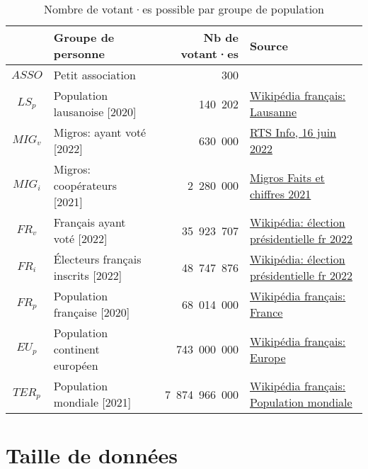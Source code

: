 \documentclass[../report]{subfiles}
\begin{document}
\begin{table}[H]
  \begin{center}
    \begin{tabular}{|c|l|r|l|}
      \hline
       & Groupe de personne                          & Nb de votant·es & Source \\
      \hline
      \hline
      $ASSO$ & Petit association                  & 300 & \\
      $LS_p$ & Population lausanoise [2020]       &         140~202 & \href{https://fr.wikipedia.org/wiki/Lausanne}{Wikipédia français: Lausanne}\\
      $MIG_v$ & Migros: ayant voté [2022]         &         630~000 & \href{https://www.rts.ch/info/suisse/13176954-la-vente-dalcool-reste-interdite-a-la-migros-apres-un-non-massif-en-votation.html}{RTS Info, 16 juin 2022}\\
      $MIG_i$ & Migros: coopérateurs [2021]       &       2~280~000 & \href{https://corporate.migros.ch/dam/jcr:d5b1ae79-a8e8-4b98-9f2d-4b4974d39486/faits-et-chiffres-2021.pdf}{Migros Faits et chiffres 2021}\\
      $FR_v$ & Français ayant voté [2022]         &      35~923~707 & \href{https://fr.wikipedia.org/wiki/Élection_présidentielle_française_de_2022}{Wikipédia: élection présidentielle fr 2022}\\
      $FR_i$ & Électeurs français inscrits [2022] &      48~747~876 & \href{https://fr.wikipedia.org/wiki/Élection_présidentielle_française_de_2022}{Wikipédia: élection présidentielle fr 2022}\\
      $FR_p$ & Population française [2020]        &      68~014~000 & \href{https://fr.wikipedia.org/wiki/France}{Wikipédia français: France}\\       
      $EU_p$ & Population continent européen      &     743~000~000 & \href{https://fr.wikipedia.org/wiki/Europe}{Wikipédia français: Europe}\\       
      $TER_p$ & Population mondiale [2021]        &   7~874~966~000 & \href{https://fr.wikipedia.org/wiki/Population_mondiale}{Wikipédia français: Population mondiale}\\       
      \hline
    \end{tabular}
  \end{center}
  \caption{Nombre de votant·es possible par groupe de population}\label{tab:}
\end{table}

\section{Taille de données}
\end{document}
